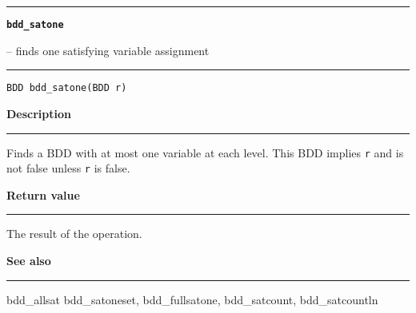 \begin{minipage}{\textwidth}

\noindent\begin{minipage}{\textwidth}
\rule{\textwidth}{0.5mm}
{\tt\bf bdd\_satone }
\--- finds one satisfying variable assignment  \hspace{\fill}
\\\rule[1.5ex]{\textwidth}{0.5mm}
\end{minipage}

\noindent\begin{verbatim}
BDD bdd_satone(BDD r) 
\end{verbatim}

\vspace{\parsep}\noindent
{\bf Description}\\\rule[1.5ex]{\textwidth}{0.2mm}\vspace{-1.5ex}\setlength{\parindent}{1em}
Finds a BDD with at most one variable at each level. This BDD
           implies {\tt r} and is not false unless {\tt r} is
	   false. 

\setlength{\parindent}{0em}\vspace{\parsep}\vspace{\baselineskip}\noindent
{\bf Return value}\\\rule[1.5ex]{\textwidth}{0.2mm}\vspace{-1.5ex}
The result of the operation. 

\vspace{\parsep}\vspace{\baselineskip}\noindent
{\bf See also}\\\rule[1.5ex]{\textwidth}{0.2mm}\vspace{-1.5ex}
bdd\_allsat bdd\_satoneset, bdd\_fullsatone, bdd\_satcount, bdd\_satcountln 
\end{minipage}
\vspace{8ex}
